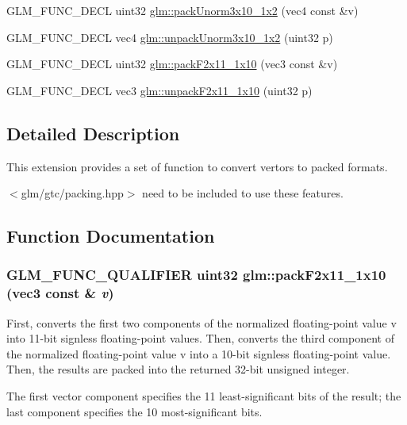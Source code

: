 \begin{CompactItemize}
\item 
GLM\_\-FUNC\_\-DECL uint32 \hyperlink{group__gtc__packing_g2cf2d11b40bd48639110456fd74c2e33}{glm::packUnorm3x10\_\-1x2} (vec4 const \&v)
\item 
GLM\_\-FUNC\_\-DECL vec4 \hyperlink{group__gtc__packing_gf69ace2b5e9234f8afb4e99c3df1193d}{glm::unpackUnorm3x10\_\-1x2} (uint32 p)
\item 
GLM\_\-FUNC\_\-DECL uint32 \hyperlink{group__gtc__packing_g8c2a0eeee677ca4dafd9e093d9e81062}{glm::packF2x11\_\-1x10} (vec3 const \&v)
\item 
GLM\_\-FUNC\_\-DECL vec3 \hyperlink{group__gtc__packing_g8b9c7991eb021d95c778bf5c0b2f7824}{glm::unpackF2x11\_\-1x10} (uint32 p)
\end{CompactItemize}


\subsection{Detailed Description}
This extension provides a set of function to convert vertors to packed formats. 

$<$glm/gtc/packing.hpp$>$ need to be included to use these features. 

\subsection{Function Documentation}
\hypertarget{group__gtc__packing_g8c2a0eeee677ca4dafd9e093d9e81062}{
\subsubsection[packF2x11\_\-1x10]{\setlength{\rightskip}{0pt plus 5cm}GLM\_\-FUNC\_\-QUALIFIER uint32 glm::packF2x11\_\-1x10 (vec3 const \& {\em v})}}
\label{group__gtc__packing_g8c2a0eeee677ca4dafd9e093d9e81062}


First, converts the first two components of the normalized floating-point value v into 11-bit signless floating-point values. Then, converts the third component of the normalized floating-point value v into a 10-bit signless floating-point value. Then, the results are packed into the returned 32-bit unsigned integer.

The first vector component specifies the 11 least-significant bits of the result; the last component specifies the 10 most-significant bits.

